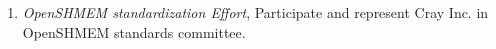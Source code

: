 \begin{enumerate}
\setcounter{enumi}{0}
\item \textit{OpenSHMEM standardization Effort}, Participate and represent Cray Inc. in
OpenSHMEM standards committee.
\end{enumerate}
